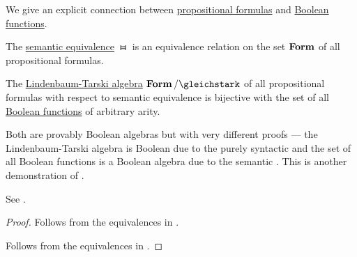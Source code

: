 \begin{theorem}\label{thm:lindenmaum_tarski_algebra_of_full_propositional_logic}
  We give an explicit connection between \hyperref[def:propositional_syntax/formula]{propositional formulas} and \hyperref[def:boolean_function]{Boolean functions}.

  \begin{thmenum}
     The \hyperref[def:propositional_semantics/equivalence]{semantic equivalence} \( \gleichstark \) is an equivalence relation on the set \( \operatorname{\mathbf{Form}} \) of all propositional formulas.

     The \hyperref[def:lindenbaum_tarski_algebra]{Lindenbaum-Tarski algebra}  \( \boldop{Form} / {{}\gleichstark} \) of all propositional formulas with respect to semantic equivalence is bijective with the set of all \hyperref[def:boolean_function]{Boolean functions} of arbitrary arity.

    Both are provably Boolean algebras but with very different proofs --- the Lindenbaum-Tarski algebra is Boolean due to the purely syntactic  and the set of all Boolean functions is a Boolean algebra due to the semantic . This is another demonstration of .

    See .
  \end{thmenum}
\end{theorem}
\begin{proof}
   Follows from the equivalences in .

   Follows from the equivalences in .
\end{proof}

